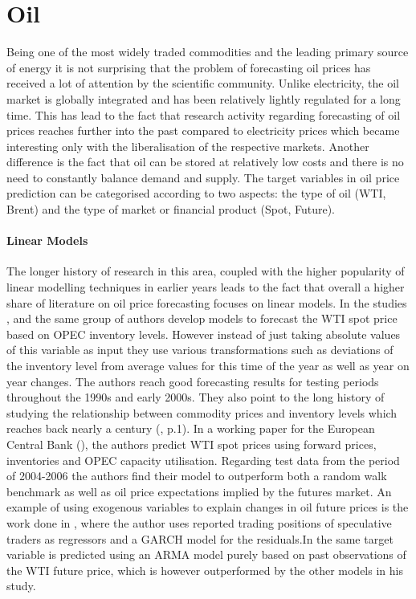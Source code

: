 \section{Oil}
Being one of the most widely traded commodities and the leading primary source of energy it is not surprising that the problem of forecasting oil prices has received a lot of attention by the scientific community. Unlike electricity, the oil market is  globally integrated and has been relatively lightly regulated for a long time.
This has lead to the fact that research activity regarding forecasting of oil prices reaches further into the past compared to electricity prices which became interesting only with the liberalisation of the respective markets.
Another difference is the fact that oil can be stored at relatively low costs and there is no need to constantly balance demand and supply. The target variables in oil price prediction can be categorised according to two aspects: the type of oil (WTI, Brent) and the type of market or financial product (Spot, Future). 

\paragraph{Linear Models}
The longer history of research in this area, coupled with the higher popularity of linear modelling techniques in earlier years leads to the fact that overall a higher share of literature on oil price forecasting focuses on linear models. In the studies \cite{ye_forecasting_2002}, \cite{ye_monthly_2005} and \cite{ye_forecasting_2006} the same group of authors develop models to forecast the WTI spot price based on OPEC inventory levels. However instead of just taking absolute values of this variable as input they use various transformations such as deviations of the inventory level from average values for this time of the year as well as year on year changes.  The authors reach good forecasting results for testing periods throughout the 1990s and early 2000s. They also point to the long history of studying the relationship between commodity prices and inventory levels which reaches back nearly a century (\cite{ye_forecasting_2006}, p.1).
In a working paper for the European Central Bank (\cite{dees_assessing_2008}), the authors predict WTI spot prices using forward prices, inventories and OPEC capacity utilisation. Regarding test data from the period of 2004-2006 the authors find their model to outperform both a random walk benchmark as well as oil price expectations implied by the futures market. An example of using exogenous variables to explain changes in oil future prices is the work done in \cite{bu_price_2011}, where the author uses reported trading positions of speculative traders as regressors and a GARCH model for the residuals.In \cite{moshiri_forecasting_2006} the same target variable is predicted using an ARMA  model purely based on past observations of the WTI future price, which is however outperformed by the other models in his study. 

